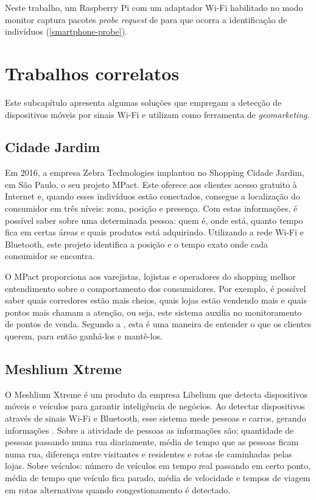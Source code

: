 Neste trabalho, um Raspberry Pi com um adaptador Wi-Fi habilitado no modo monitor captura pacotes \emph{probe request} de 
para que ocorra a identificação de indivíduos (\autoref{smartphone-probe}).

\section{Trabalhos correlatos}
\label{trabalhos-correlatos}
Este subcapítulo apresenta algumas soluções que
empregam a detecção de dispositivos móveis por sinais Wi-Fi e utilizam como ferramenta
de \emph{geomarketing}.

\subsection{Cidade Jardim}

Em 2016, a empresa Zebra Technologies implantou no Shopping Cidade Jardim, em São Paulo, o seu
projeto MPact. Este oferece aos clientes acesso gratuito à Internet e, quando esses indivíduos estão
conectados, consegue a localização do consumidor em três níveis: zona, posição e
presença. Com estas informações, é possível saber sobre uma determinada pessoa:
quem é, onde está, quanto tempo fica em certas áreas e quais produtos está
adquirindo. Utilizando a rede Wi-Fi e Bluetooth, este projeto identifica a
posição e o tempo exato onde cada consumidor se encontra.

O MPact proporciona aos varejistas, lojistas e operadores do shopping melhor
entendimento sobre o comportamento dos consumidores. Por exemplo, é possível
saber quais corredores estão mais cheios, quais lojas estão vendendo mais e
quais pontos mais chamam a atenção, ou seja, este sistema auxilia no
monitoramento de pontos de venda. Segundo a , esta é uma
maneira de entender o que os clientes querem, para então ganhá-los e mantê-los.

\subsection{Meshlium Xtreme}
O Meshlium Xtreme é um produto da empresa Libelium
que detecta dispositivos móveis e veículos para garantir inteligência de
negócios. Ao detectar dispositivos através de sinais Wi-Fi e Bluetooth, esse
sistema mede pessoas e carros, gerando informações \cite{libelium}. Sobre a
atividade de pessoas as informações são: quantidade de pessoas passando numa rua
diariamente, média de tempo que as pessoas ficam numa rua, diferença entre
visitantes e residentes e rotas de caminhadas pelas lojas. Sobre veículos:
número de veículos em tempo real passando em certo ponto, média de tempo que
veículo fica parado, média de velocidade e tempos de viagem em rotas
alternativas quando congestionamento é detectado.

